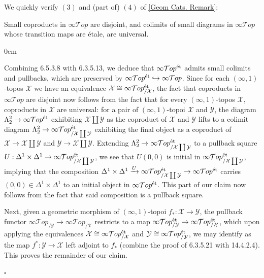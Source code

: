 \documentclass[10pt]{article}
\newcommand{\cT}{\mathcal{T}}
\newcommand{\cX}{\mathcal{X}}
\newcommand{\cY}{\mathcal{Y}}
\renewcommand{\qed}{\hfill$\square$}
\renewenvironment{proof}{\begin{addmargin}[1em]{0em}\begin{newproof}}{\end{newproof}\end{addmargin}\qed}
\theoremstyle{witharg}
\theoremstyle{witharg}
\theoremstyle{witharg2}
\begin{document}
\noindent We quickly verify $(3)$ and (part of) $(4)$ of \ref{Geom Cats. Remark}:

\begin{proposition}{}\label{Coproducts of Inf.Topoi}

    Small coproducts in $\infty\cT op$ are disjoint, and colimits of small diagrams in $\infty\cT op$ whose transition maps are \'{e}tale, are universal. 
    
\end{proposition}


\begin{proof}

    Combining  6.5.3.8 with  6.3.5.13, we deduce that $\infty\cT op^{\textnormal{\'{e}t}}$ admits small colimits and pullbacks, which are preserved by $\infty\cT op^{\textnormal{\'{e}t}}\hookrightarrow \infty\cT op$. Since for each $(\infty,1)$-topos $\cX$ we have an equivalence $\cX\cong \infty\cT op^{\textnormal{\'{e}t}}_{/\cX}$, the fact that coproducts in $\infty\cT op$ are disjoint now follows from the fact that for every $(\infty,1)$-topos $\cX$, coproducts in $\cX$ are universal: for a pair of $(\infty,1)$-topoi $\cX$ and $\cY$, the diagram $\Lambda^2_2\rightarrow \infty\cT op^{\textnormal{\'{e}t}}$ exhibiting $\cX\coprod \cY$ as the coproduct of $\cX$ and $\cY$ lifts to a colimit diagram $\Lambda^2_2\rightarrow \infty\cT op^{\textnormal{\'{e}t}}_{/\cX\coprod \cY}$ exhibiting the final object as a coproduct of $\cX\rightarrow \cX\coprod \cY$ and $\cY\rightarrow \cX\coprod \cY$. Extending $\Lambda^2_2\rightarrow \infty\cT op^{\textnormal{\'{e}t}}_{/\cX\coprod \cY}$ to a pullback square  $U:\Delta^1\times \Delta^1\rightarrow \infty\cT op^{\textnormal{\'{e}t}}_{/\cX\coprod \cY}$, we see that $U(0,0)$ is initial in $\infty\cT op^{\textnormal{\'{e}t}}_{/\cX\coprod \cY}$, implying that the composition $\Delta^1\times \Delta^1\xrightarrow{U}\infty\cT op^{\textnormal{\'{e}t}}_{/\cX\coprod \cY}\rightarrow \infty\cT op^{\textnormal{\'{e}t}}$ carries $(0,0)\in \Delta^1\times \Delta^1$ to an initial object in $\infty\cT op^{\textnormal{\'{e}t}}$. This part of our claim now follows from the fact that said composition is a pullback square. 
    
    Next, given a geometric morphism of $(\infty,1)$-topoi $f_*:\cX\rightarrow \cY$, the pullback functor $\infty\cT op_{/\cY}\rightarrow \infty\cT op_{/\cX}$ restricts to a map $\infty\cT op^{\textnormal{\'{e}t}}_{/\cY}\rightarrow \infty\cT op^{\textnormal{\'{e}t}}_{/\cX}$, which upon applying the equivalences $\cX\cong \infty\cT op^{\textnormal{\'{e}t}}_{/\cX}$ and $\cY\cong \infty\cT op^{\textnormal{\'{e}t}}_{/\cY}$, we may identify as the map $f^*:\cY\rightarrow \cX$ left adjoint to $f_*$ (combine the proof of  6.3.5.21 with  14.4.2.4). This proves the remainder of our claim. 

    
\end{proof}
\end{document}
